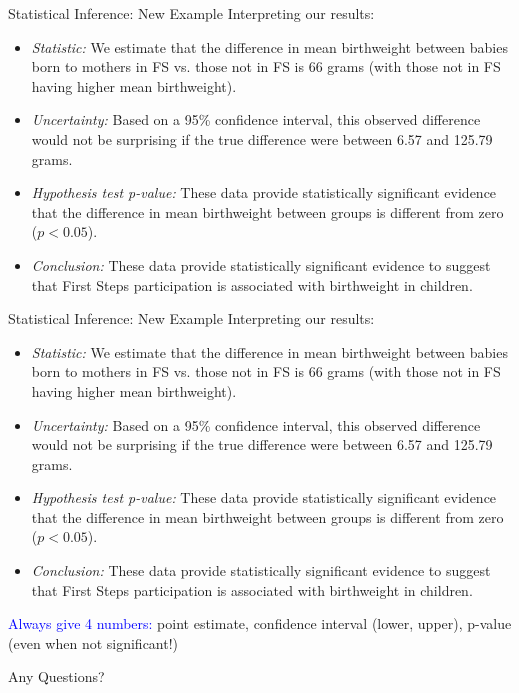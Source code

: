\documentclass[10pt,t]{beamer}
\begin{document}
\begin{frame}{Statistical Inference: New Example}
Interpreting our results:

\vspace{0.3cm}

\begin{itemize}
	\item \textit{Statistic:} We estimate that the difference in mean birthweight between babies born to mothers in FS vs. those not in FS is 66 grams (with those not in FS having higher mean birthweight).
	\item \textit{Uncertainty:} Based on a 95\% confidence interval, this observed difference would not be surprising if the true difference were between 6.57 and 125.79 grams.
	\item \textit{Hypothesis test p-value:} These data provide statistically significant evidence that the difference in mean birthweight between groups is different from zero ($p < 0.05$).
	\item \textit{Conclusion:} These data provide statistically significant evidence to suggest that First Steps participation is associated with birthweight in children.
\end{itemize}

\end{frame}

\begin{frame}{Statistical Inference: New Example}
Interpreting our results:

\vspace{0.3cm}

\begin{itemize}
	\item \textit{Statistic:} We estimate that the difference in mean birthweight between babies born to mothers in FS vs. those not in FS is 66 grams (with those not in FS having higher mean birthweight).
	\item \textit{Uncertainty:} Based on a 95\% confidence interval, this observed difference would not be surprising if the true difference were between 6.57 and 125.79 grams.
	\item \textit{Hypothesis test p-value:} These data provide statistically significant evidence that the difference in mean birthweight between groups is different from zero ($p < 0.05$).
	\item \textit{Conclusion:} These data provide statistically significant evidence to suggest that First Steps participation is associated with birthweight in children.
\end{itemize}

\vspace{0.3cm}

\textcolor{blue}{Always give 4 numbers:} point estimate, confidence interval (lower, upper), p-value (even when not significant!)

\end{frame}

\begin{frame}[c]
\centering \huge Any Questions?
\end{frame}
\end{document}

